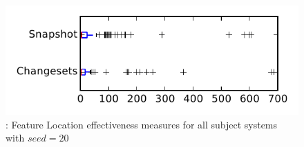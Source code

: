 
\begin{figure}
\centering
\includegraphics[height=0.4\textheight]{figures/flt_seed/rq1_tiny_20}
\caption{\rone: Feature Location effectiveness measures for all subject systems with $seed=20$}
\label{fig:flt_seed:rq1:tiny}
\end{figure}
